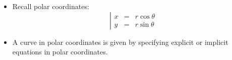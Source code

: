 \begin{frame}
\begin{itemize}
\item Recall polar coordinates:
\[
\left|\begin{array}{rcl}
x&=& r\cos \theta \\
y&=& r\sin \theta
\end{array}\right.
\]
\item<2-> A curve in polar coordinates is given by specifying explicit or implicit equations in polar coordinates.
\end{itemize}

\end{frame}
